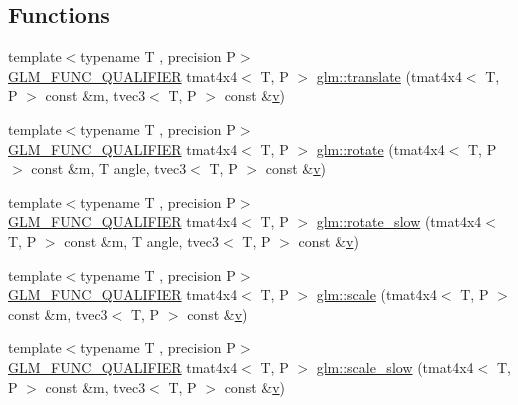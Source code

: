\subsection*{Functions}
\begin{DoxyCompactItemize}
\item 
{\footnotesize template$<$typename T , precision P$>$ }\\\mbox{\hyperlink{setup_8hpp_a33fdea6f91c5f834105f7415e2a64407}{G\+L\+M\+\_\+\+F\+U\+N\+C\+\_\+\+Q\+U\+A\+L\+I\+F\+I\+ER}} tmat4x4$<$ T, P $>$ \mbox{\hyperlink{group__gtc__matrix__transform_gaee134ab77c6c5548a6ebf4e8e476c6ed}{glm\+::translate}} (tmat4x4$<$ T, P $>$ const \&m, tvec3$<$ T, P $>$ const \&\mbox{\hyperlink{glad_8h_a14cfbe2fc2234f5504618905b69d1e06}{v}})
\item 
{\footnotesize template$<$typename T , precision P$>$ }\\\mbox{\hyperlink{setup_8hpp_a33fdea6f91c5f834105f7415e2a64407}{G\+L\+M\+\_\+\+F\+U\+N\+C\+\_\+\+Q\+U\+A\+L\+I\+F\+I\+ER}} tmat4x4$<$ T, P $>$ \mbox{\hyperlink{group__gtc__matrix__transform_ga161b1df124348f232d994ba7958e4815}{glm\+::rotate}} (tmat4x4$<$ T, P $>$ const \&m, T angle, tvec3$<$ T, P $>$ const \&\mbox{\hyperlink{glad_8h_a14cfbe2fc2234f5504618905b69d1e06}{v}})
\item 
{\footnotesize template$<$typename T , precision P$>$ }\\\mbox{\hyperlink{setup_8hpp_a33fdea6f91c5f834105f7415e2a64407}{G\+L\+M\+\_\+\+F\+U\+N\+C\+\_\+\+Q\+U\+A\+L\+I\+F\+I\+ER}} tmat4x4$<$ T, P $>$ \mbox{\hyperlink{namespaceglm_a9fbbd196726ba74b00b82b9a3d48487f}{glm\+::rotate\+\_\+slow}} (tmat4x4$<$ T, P $>$ const \&m, T angle, tvec3$<$ T, P $>$ const \&\mbox{\hyperlink{glad_8h_a14cfbe2fc2234f5504618905b69d1e06}{v}})
\item 
{\footnotesize template$<$typename T , precision P$>$ }\\\mbox{\hyperlink{setup_8hpp_a33fdea6f91c5f834105f7415e2a64407}{G\+L\+M\+\_\+\+F\+U\+N\+C\+\_\+\+Q\+U\+A\+L\+I\+F\+I\+ER}} tmat4x4$<$ T, P $>$ \mbox{\hyperlink{group__gtc__matrix__transform_ga8f062fcc07e2445500793f2803afebb0}{glm\+::scale}} (tmat4x4$<$ T, P $>$ const \&m, tvec3$<$ T, P $>$ const \&\mbox{\hyperlink{glad_8h_a14cfbe2fc2234f5504618905b69d1e06}{v}})
\item 
{\footnotesize template$<$typename T , precision P$>$ }\\\mbox{\hyperlink{setup_8hpp_a33fdea6f91c5f834105f7415e2a64407}{G\+L\+M\+\_\+\+F\+U\+N\+C\+\_\+\+Q\+U\+A\+L\+I\+F\+I\+ER}} tmat4x4$<$ T, P $>$ \mbox{\hyperlink{namespaceglm_afae64498e6edd7aa501c1a7fa071f779}{glm\+::scale\+\_\+slow}} (tmat4x4$<$ T, P $>$ const \&m, tvec3$<$ T, P $>$ const \&\mbox{\hyperlink{glad_8h_a14cfbe2fc2234f5504618905b69d1e06}{v}})

\end{DoxyCompactItemize}
